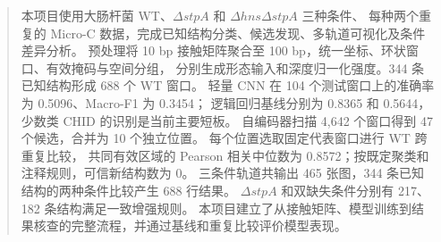 \begin{abstract}
本项目使用大肠杆菌 WT、$\Delta stpA$ 和 $\Delta hns\Delta stpA$ 三种条件、
每种两个重复的 Micro-C 数据，完成已知结构分类、候选发现、多轨道可视化及条件差异分析。
预处理将 10 bp 接触矩阵聚合至 100 bp，统一坐标、环状窗口、有效掩码与空间分组，
分别生成形态输入和深度归一化强度。344 条已知结构形成 688 个 WT 窗口。
轻量 CNN 在 104 个测试窗口上的准确率为 0.5096、Macro-F1 为 0.3454；
逻辑回归基线分别为 0.8365 和 0.5644，少数类 CHID 的识别是当前主要短板。
自编码器扫描 4,642 个窗口得到 47 个候选，合并为 10 个独立位置。
每个位置选取固定代表窗口进行 WT 跨重复比较，
共同有效区域的 Pearson 相关中位数为 0.8572；按既定聚类和注释规则，可信新结构数为 0。
三条件轨道共输出 465 张图，344 条已知结构的两种条件比较产生 688 行结果。
$\Delta stpA$ 和双缺失条件分别有 217、182 条结构满足一致增强规则。
本项目建立了从接触矩阵、模型训练到结果核查的完整流程，并通过基线和重复比较评价模型表现。
\end{abstract}
